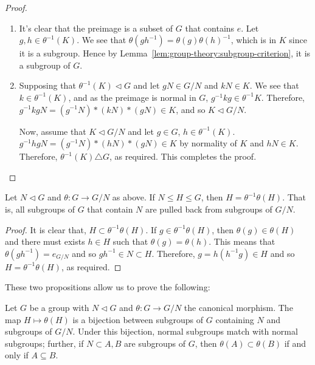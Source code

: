 \begin{proof}
  \begin{enumerate}
  \item
    It's clear that the preimage is a subset of \(G\) that contains \(e\).
    Let \(g, h \in \theta^{-1}(K)\).
    We see that \(\theta(gh^{-1}) = \theta(g)\theta(h)^{-1}\), which is in \(K\) since it is a subgroup.
    Hence by Lemma~\ref{lem:group-theory:subgroup-criterion}, it is a subgroup of \(G\).

    \item
      Supposing that \(\theta^{-1}(K) \triangleleft G\) and let \(gN \in G/N\) and \(kN \in K\).
      We see that \(k \in \theta^{-1}(K)\), and as the preimage is normal in \(G\), \(g^{-1}kg \in \theta^{-1}K\).
      Therefore, \(g^{-1}kgN = (g^{-1}N)*(kN)*(gN) \in K\), and so \(K \triangleleft G/N\).

      Now, assume that \(K \triangleleft G/N\) and let \(g \in G\), \(h \in \theta^{-1}(K)\).
      \(g^{-1}hgN = (g^{-1}N)*(hN)*(gN) \in K\) by normality of \(K\) and \(hN \in K\).
      Therefore, \(\theta^{-1}(K) \triangle G\), as required.
      This completes the proof.

  \end{enumerate}
\end{proof}

\begin{proposition}\label{prp:group-theory:normal-subgroups-pullback}
  Let \(N \triangleleft G\) and \(\theta : G \to G/N\) as above. If \(N \leq H \leq G\), then \(H = \theta^{-1}\theta(H)\).
  That is, all subgroups of \(G\) that contain \(N\) are pulled back from subgroups of \(G/N\).
\end{proposition}

\begin{proof}
  It is clear that, \(H \subset \theta^{-1}\theta (H)\).
  If \(g \in \theta^{-1}\theta(H)\), then \(\theta(g) \in \theta(H)\) and there must exists \(h \in H\) such that \(\theta(g) = \theta(h)\).
  This means that \(\theta(g h^{-1}) = e_{G/N}\) and so \(g h^{-1} \in N \subset H\).
  Therefore, \(g = h(h^{-1}g) \in H\) and so \(H = \theta^{-1}\theta(H)\), as required.
\end{proof}



These two propositions allow us to prove the following:

\begin{theorem}
  \label{thm:group-theory:the-correspondence-theorem}
  Let \(G\) be a group with \(N \triangleleft G\) and \(\theta: G \to G/N\) the canonical morphism.
  The map \(H \mapsto \theta(H)\) is a bijection between subgroups of \(G\) containing \(N\) and subgroups of \(G/N\).
  Under this bijection, normal subgroups match with normal subgroups; further, if \(N \subset A,B\) are subgroups of \(G\), then \(\theta(A) \subset \theta(B)\) if and only if \(A \subseteq B\).
\end{theorem}

